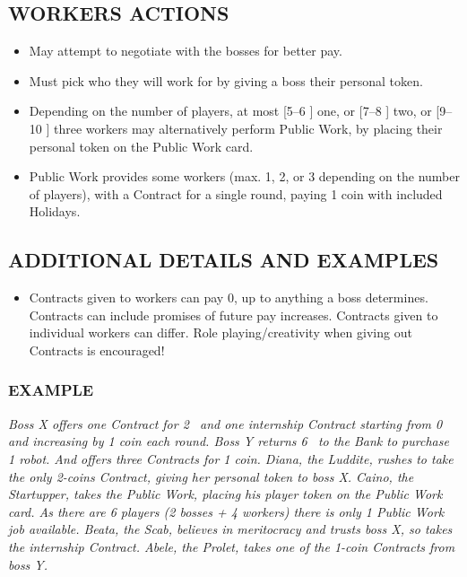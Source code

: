     \subsection{WORKERS ACTIONS}
    
        \begin{itemize}
            \item May attempt to negotiate with the bosses for better pay.
            \item Must pick who they will work for by giving a boss their personal token.
            \item Depending on the number of players, at most [5–6 \faPeopleGroup] one, or [7–8 \faPeopleGroup] two,
            or [9–10 \faPeopleGroup] three workers may alternatively perform Public Work, by placing their
            personal token on the Public Work card.
            \item Public Work provides some workers (max. 1, 2, or 3 depending on the number
            of players), with a Contract for a single round, paying 1 coin with included Holidays.
        \end{itemize}
            
    \subsection{ADDITIONAL DETAILS AND EXAMPLES}
    
        \begin{itemize}
            \item Contracts given to workers can pay 0, up to anything a boss determines.
            Contracts can include promises of future pay increases. Contracts given to
            individual workers can differ. Role playing/creativity when giving out Contracts is encouraged!
        \end{itemize}
    
        \subsubsection{EXAMPLE}
        
            \textit{Boss X offers one Contract for 2 \faRubleSign\ and one internship Contract starting from 0 and increasing
            by 1 coin each round. Boss Y returns 6 \faRubleSign\ to the Bank to purchase 1 robot. And offers three
            Contracts for 1 coin. Diana, the Luddite, rushes to take the only 2-coins Contract, giving her
            personal token to boss X. Caino, the Startupper, takes the Public Work, placing his player
            token on the Public Work card. As there are 6 players (2 bosses + 4 workers) there is only 1
            Public Work job available. Beata, the Scab, believes in meritocracy and trusts boss X, so takes
            the internship Contract. Abele, the Prolet, takes one of the 1-coin Contracts from boss Y.}



